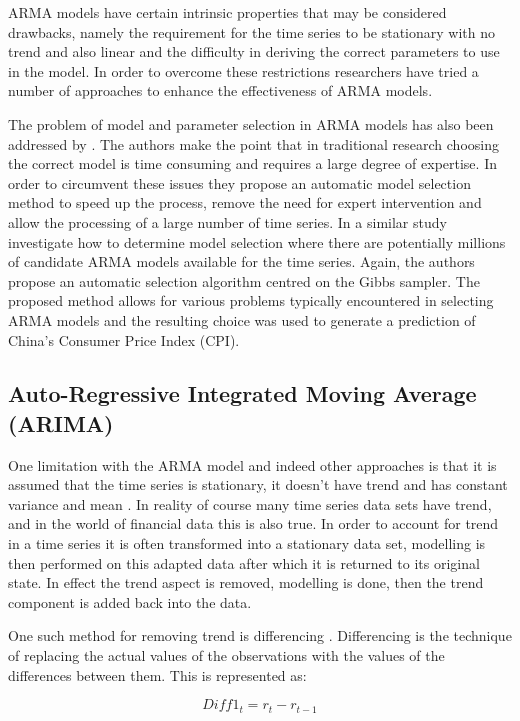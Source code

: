 ARMA models have certain intrinsic properties that may be considered drawbacks, namely the requirement for the time series to be stationary with no trend and also linear and the difficulty in deriving the correct parameters to use in the model. In order to overcome these restrictions researchers have tried a number of approaches to enhance the effectiveness of ARMA models.

The problem of model and parameter selection in ARMA models has also been addressed by \cite{Rojas2008519}. The authors make the point that in traditional research choosing the correct model is time consuming and requires a large degree of expertise. In order to circumvent these issues they propose an automatic model selection method to speed up the process, remove the need for expert intervention and allow the processing of a large number of time series. In a similar study \cite{Qian20076180} investigate how to determine model selection where there are potentially millions of candidate ARMA models available for the time series. Again, the authors propose an automatic selection algorithm centred on the Gibbs sampler. The proposed method allows for various problems typically encountered in selecting ARMA models and the resulting choice was used to generate a prediction of China’s Consumer Price Index (CPI).

\subsection{Auto-Regressive Integrated Moving Average (ARIMA)}
\label{sec:arima}
One limitation with the ARMA model and indeed other approaches is that it is assumed that the time series is stationary, it doesn't have trend and has constant variance and mean \citep{shumway2010time}. In reality of course many time series data sets have trend, and in the world of financial data this is also true. In order to account for trend in a time series it is often transformed into a stationary data set, modelling is then performed on this adapted data after which it is returned to its original state. In effect the trend aspect is removed, modelling is done, then the trend component is added back into the data.

One such method for removing trend is differencing \citep{mills2011}. Differencing is the technique of replacing the actual values of the observations with the values of the differences between them. This is represented as:

\[ Diff1_{t}=r_{t}-r_{t-1} \]

